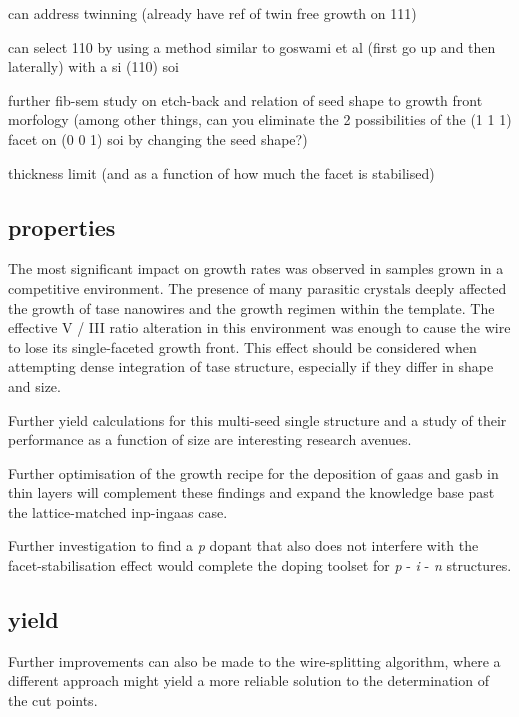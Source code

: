 can address twinning (already have ref of twin free growth on 111)

can select 110 by using a method similar to goswami et al (first go up and then laterally) with a si (110) soi

further fib-sem study on etch-back and relation of seed shape to growth front morfology (among other things, can you eliminate the 2 possibilities of the (1 1 1) facet on (0 0 1) soi by changing the seed shape?)

thickness limit (and as a function of how much the facet is stabilised)

\subsection{properties}



The most significant impact on growth rates was observed in samples grown in a competitive environment. The presence of many parasitic crystals deeply affected the growth of \acs{tase} nanowires and the growth regimen within the template. The effective V / III ratio alteration in this environment was enough to cause the wire to lose its single-faceted growth front. This effect should be considered when attempting dense integration of \acs{tase} structure, especially if they differ in shape and size.

Further yield calculations for this multi-seed single structure and a study of their performance as a function of size are interesting research avenues. 

Further optimisation of the growth recipe for the deposition of \acs{gaas} and \acs{gasb} in thin layers will complement these findings and expand the knowledge base past the lattice-matched \acs{inp}-\acs{ingaas} case.

Further investigation to find a \textit{p} dopant that also does not interfere with the facet-stabilisation effect would complete the doping toolset for \textit{p} - \textit{i} - \textit{n} structures.

\subsection{yield}

Further improvements can also be made to the wire-splitting algorithm, where a different approach might yield a more reliable solution to the determination of the cut points.